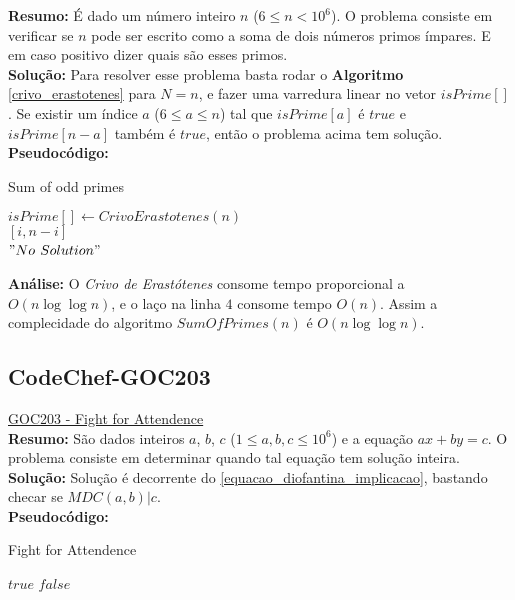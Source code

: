 \textbf{Resumo:} 
É dado um número inteiro $n$ ($6 \leq n < 10^6$). O problema consiste em verificar se $n$ pode ser escrito como a soma de dois números
primos ímpares. E em caso positivo dizer quais são esses primos.
\\

\textbf{Solução:}
Para resolver esse problema basta rodar o \textbf{Algoritmo} \autoref{crivo_erastotenes} para $N=n$, e fazer uma varredura linear no vetor $isPrime[]$. Se existir um índice $a$ ($6 \leq a \leq n$) tal que $isPrime[a]$ é $true$ e $isPrime[n-a]$ também é $true$, então o problema acima tem solução. 
\\

\textbf{Pseudocódigo:}
\begin{algorithm}
\caption{Sum of odd primes}
\begin{algorithmic}[1]
\State $isPrime[] \gets CrivoErastotenes(n)$
\\
\State \Return $[i, n-i]$
\EndIf
\EndFor
\\
\State \Return $"No$ $Solution"$
\EndProcedure
\end{algorithmic}
\end{algorithm}

\textbf{Análise:}
O \textit{Crivo de Erastótenes} consome tempo proporcional a $O(n \log \log n)$, e o laço na linha $4$ consome tempo $O(n)$. Assim a complecidade do algoritmo $SumOfPrimes(n)$ é $O(n \log \log n)$.

\subsection{CodeChef-GOC203}
\href{https://www.codechef.com/problems/GOC203}{GOC203 - Fight for Attendence}\\

\textbf{Resumo:}
São dados inteiros $a$, $b$, $c$ ($1 \leq a, b, c \leq 10^6$) e a equação $ax+by=c$. O problema consiste em determinar 
quando tal equação tem solução inteira.
\\

\textbf{Solução:}
Solução é decorrente do \autoref{equacao_diofantina_implicacao}, bastando checar se $MDC(a,b)|c$.
\\

\textbf{Pseudocódigo:}
\begin{algorithm}
\caption{Fight for Attendence}
\begin{algorithmic}[1]
\State \Return $true$
\EndIf
\State \Return $false$
\EndProcedure
\end{algorithmic}
\end{algorithm}

